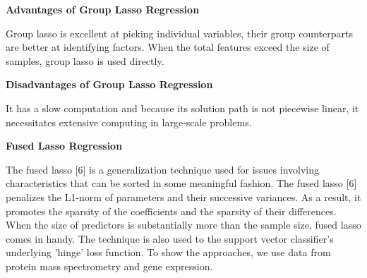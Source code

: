 \documentclass{article} %
\begin{document}
\noindent 

\noindent \textbf{Advantages of Group Lasso Regression}

\noindent Group lasso is excellent at picking individual variables, their group counterparts are better at identifying factors. When the total features exceed the size of samples, group lasso is used directly.

\noindent \textbf{Disadvantages of Group Lasso Regression}

\noindent It has a slow computation and because its solution path is not piecewise linear, it necessitates extensive computing in large-scale problems.

\noindent 

\noindent \textbf{Fused Lasso Regression}

\noindent The fused lasso [6] is a generalization technique used for issues involving characteristics that can be sorted in some meaningful fashion. The fused lasso [6] penalizes the L1-norm of parameters and their successive variances. As a result, it promotes the sparsity of the coefficients and the sparsity of their differences. When the size of predictors is substantially more than the sample size, fused lasso comes in handy. The technique is also used to the support vector classifier's underlying 'hinge' loss function. To show the approaches, we use data from protein mass spectrometry and gene expression.
\end{document}
